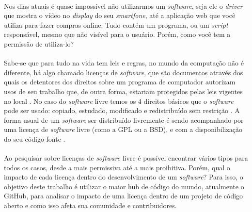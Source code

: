 \paragraph{}
Nos dias atuais é quase impossível não utilizarmos um \textit{software}, seja ele o \textit{driver} que mostra o vídeo no \textit{display} do seu \textit{smartfone}, até a aplicação web que você utiliza para fazer compras online. Tudo contém um programa, ou um \textit{script} responsável, mesmo que não visível para o usuário. Porém, como você tem a permissão de utiliza-lo?

\paragraph{}
Sabe-se que para tudo na vida tem leis e regras, no mundo da computação não é diferente, há algo chamado licenças de \textit{software}, que são documentos através dos quais os detentores dos direitos sobre um programa de computador autorizam usos de seu trabalho que, de outra forma, estariam protegidos pelas leis vigentes no local \cite{sabino2009licenccas}. No caso do \textit{software} livre temos os 4 direitos básicos que o \textit{software} pode ser usado: copiado, estudado, modificado e redistribuído sem restrição \cite{fsf}. A forma usual de um \textit{software} ser distribuído livremente é sendo acompanhado por uma licença de \textit{software} livre (como a GPL ou a BSD), e com a disponibilização do seu código-fonte \cite{campos2006software}.

\paragraph{}
Ao pesquisar sobre licenças de \textit{software} livre é possível encontrar vários tipos para todos os casos, desde a mais permissiva até a mais proibitiva. Porém, qual o impacto de cada licença dentro do desenvolvimento de um \textit{software}? Para isso, o objetivo deste trabalho é utilizar o maior hub de código do mundo, atualmente o GitHub, para analisar o impacto de uma licença dentro de um projeto de código aberto e como isso afeta sua comunidade e contribuidores.


